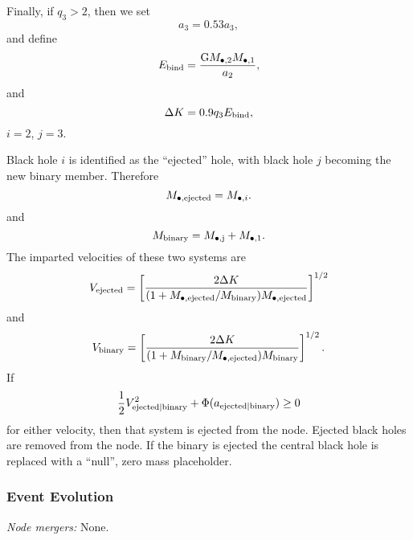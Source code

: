 Finally, if $q_3 > 2$, then we set
\begin{equation}
a_3 =0.53 a_3,
\end{equation}
and define
\begin{equation}
E_{\rm bind} = {{\rm G} M_{\bullet, 2} M_{\bullet, 1} \over a_2},
\end{equation}
and
\begin{equation}
\Delta K =0.9 q_3 E_{\rm bind},
\end{equation}
$i=2$, $j=3$.

Black hole $i$ is identified as the ``ejected'' hole, with black hole $j$ becoming the new binary member. Therefore
\begin{equation}
 M_{\bullet, \rm ejected} = M_{\bullet, i}.
\end{equation}
and
\begin{equation}
 M_{\rm binary} = M_{\rm \bullet, j} + M_{\rm \bullet, 1}.
\end{equation}
The imparted velocities of these two systems are
\begin{equation}
 V_{\rm ejected} = \left[ {2 \Delta K \over (1+M_{\bullet, \rm ejected}/M_{\rm binary} ) M_{\bullet, \rm ejected} }\right]^{1/2}
\end{equation}
and
\begin{equation}
 V_{\rm binary} = \left[ {2 \Delta K \over (1+M_{\rm binary} /M_{\bullet, \rm ejected}) M_{\rm binary}}\right]^{1/2}.
\end{equation}
If
\begin{equation}
 \frac{1}{2} V_{\rm ejected|binary}^2 + \Phi(a_{\rm ejected|binary}) \ge 0
\end{equation}
for either velocity, then that system is ejected from the node. Ejected black holes are removed from the node. If the binary is ejected the central black hole is replaced with a ``null'', zero mass placeholder.

\subsubsection{Event Evolution}

\noindent\emph{Node mergers:} None.\\

